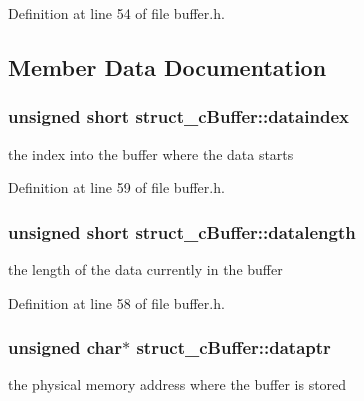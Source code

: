 \-Definition at line 54 of file buffer.\-h.



\subsection{\-Member \-Data \-Documentation}
\hypertarget{structstruct__c_buffer_a7e8a4fbfa270d36207de44b2ed5e7c8c}{
\subsubsection[{dataindex}]{\setlength{\rightskip}{0pt plus 5cm}unsigned short {\bf struct\-\_\-c\-Buffer\-::dataindex}}}\label{structstruct__c_buffer_a7e8a4fbfa270d36207de44b2ed5e7c8c}


the index into the buffer where the data starts 



\-Definition at line 59 of file buffer.\-h.

\hypertarget{structstruct__c_buffer_ace222cd69a1c185a47f0922c4c626bbd}{
\subsubsection[{datalength}]{\setlength{\rightskip}{0pt plus 5cm}unsigned short {\bf struct\-\_\-c\-Buffer\-::datalength}}}\label{structstruct__c_buffer_ace222cd69a1c185a47f0922c4c626bbd}


the length of the data currently in the buffer 



\-Definition at line 58 of file buffer.\-h.

\hypertarget{structstruct__c_buffer_ac5d0be464bcb156e014d1f6e5ad63330}{
\subsubsection[{dataptr}]{\setlength{\rightskip}{0pt plus 5cm}unsigned char$\ast$ {\bf struct\-\_\-c\-Buffer\-::dataptr}}}\label{structstruct__c_buffer_ac5d0be464bcb156e014d1f6e5ad63330}


the physical memory address where the buffer is stored 



